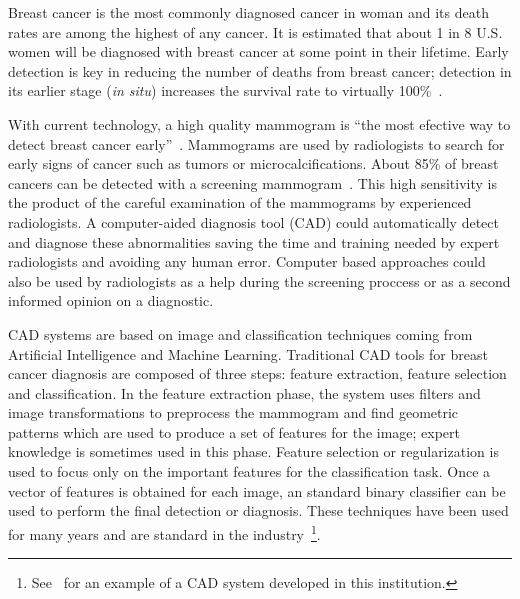Breast cancer is the most commonly diagnosed cancer in woman and its death rates are among the highest of any cancer. It is estimated that about 1 in 8 U.S. women will be diagnosed with breast cancer at some point in their lifetime. Early detection is key in reducing the number of deaths from breast cancer; detection in its earlier stage (\textit{in situ}) increases the survival rate to virtually 100\%~\cite{Howlader2014}.

With current technology, a high quality mammogram is ``the most efective way to detect breast cancer early''~\cite{Mammograms2014}. Mammograms are used by radiologists to search for early signs of cancer such as tumors or microcalcifications. About 85\% of breast cancers can be detected with a screening mammogram~\cite{PerformanceMammography2013}. This high sensitivity is the product of the careful examination of the mammograms by experienced radiologists. A computer-aided diagnosis tool (CAD) could automatically detect and diagnose these abnormalities saving the time and training needed by expert radiologists and avoiding any human error. Computer based approaches could also be used by radiologists as a help during the screening proccess or as a second informed opinion on a diagnostic.

CAD systems are based on image and classification techniques coming from Artificial Intelligence and Machine Learning. Traditional CAD tools for breast cancer diagnosis are composed of three steps: feature extraction, feature selection and classification. In the feature extraction phase, the system uses filters and image transformations to preprocess the mammogram and find geometric patterns which are used to produce a set of features for the image; expert knowledge is sometimes used in this phase. Feature selection or regularization is used to focus only on the important features for the classification task. Once a vector of features is obtained for each image, an standard binary classifier can be used to perform the final detection or diagnosis. These techniques have been used for many years and are standard in the industry~\footnote{See~\cite{Hernandez2014} for an example of a CAD system developed in this institution.}.

